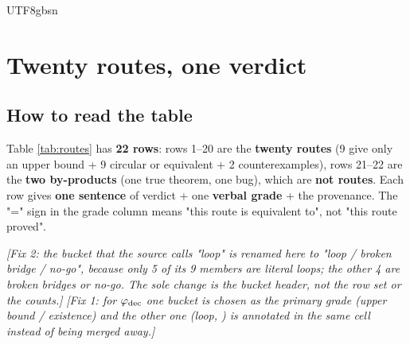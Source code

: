 \documentclass[11pt,a4paper]{article}
\newcommand{\code}[1]{\texttt{\footnotesize\detokenize{#1}}\allowbreak}
\begin{document}
\begin{CJK}{UTF8}{gbsn}
\section{Twenty routes, one verdict}\label{sec:table}
\subsection{How to read the table}

Table \ref{tab:routes} has \textbf{22 rows}: rows 1--20 are the \textbf{twenty routes} (9 give only an upper bound + 9 circular or equivalent + 2 counterexamples),
rows 21--22 are the \textbf{two by-products} (one true theorem, one bug), which are \textbf{not routes}.
Each row gives \textbf{one sentence} of verdict + one \textbf{verbal grade} + the provenance.
The "=" sign in the grade column means "this route is equivalent to", not "this route proved".

{\footnotesize\emph{[Fix 2: the bucket that the source calls "loop" is \emph{renamed} here to "loop / broken bridge / no-go", because only 5 of its 9 members are literal loops; the other 4 are broken bridges or no-go. The sole change is the bucket header, not the row set or the counts.]}}
{\footnotesize\emph{[Fix 1: for $\varphi_{\rm dec}$ one bucket is chosen as the primary grade (upper bound / existence) and the other one (loop, \code{RUNBOOK:15970--15998}) is annotated in the same cell instead of being merged away.]}}


\end{CJK}
\end{document}
